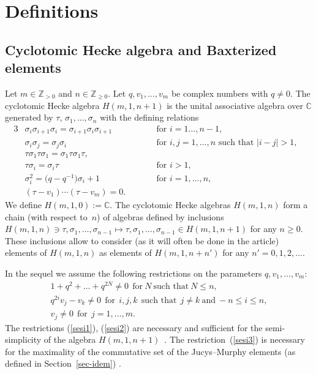 \section{Def\/initions}\label{sec-def}

\subsection{Cyclotomic Hecke algebra and Baxterized elements}\label{subsec-def}

Let $m\in\mathbb{Z}_{>0}$ and $n\in\mathbb{Z}_{\geq 0}$. Let $q,v_1,\dots,v_m$ be complex numbers with $q\neq 0$.
The cyclotomic Hecke algebra $H(m,1,n+1)$ is the unital associative algebra over $\mathbb{C}$ generated by $\tau$, $\sigma_1,\dots,\sigma_n$ with the def\/ining relations
\begin{alignat*}{3}
& \sigma_i\sigma_{i+1}\sigma_i=\sigma_{i+1}\sigma_i\sigma_{i+1}\qquad  && \text{for $i=1\dots,n-1$},& \nonumber\\
& \sigma_i\sigma_j=\sigma_j\sigma_i \qquad  && \text{for $i,j=1,\dots,n$ such that $|i-j|>1$},& \nonumber\\
& \tau\sigma_1\tau\sigma_1=\sigma_1\tau\sigma_1\tau ,\qquad &&& \nonumber\\
& \tau\sigma_i=\sigma_i\tau \qquad  && \text{for $i>1$},& \nonumber\\
& \sigma_i^2=\big(q-q^{-1}\big)\sigma_i+1 \qquad  && \text{for $i=1,\dots,n$},& \nonumber\\
& (\tau-v_1)\cdots(\tau-v_m)=0  .\qquad &&& %
 \end{alignat*}
We def\/ine $H(m,1,0):=\mathbb{C}$. The cyclotomic Hecke algebras $H(m,1,n)$ form a chain (with respect to~$n$)
of algebras def\/ined by inclusions
$H(m,1,n)\ni \tau,\sigma_1,\dots,\sigma_{n-1}\mapsto  \tau,\sigma_1,\dots,\sigma_{n-1}\in H(m,1,n+1)$ for any $n\geq 0$. These inclusions allow to consider (as it will often be done in the article) elements of $H(m,1,n)$ as elements of $H(m,1,n+n')$ for any $n'=0,1,2,\dots$.


In the sequel we assume the following restrictions on the parameters $q,v_1,\dots,v_m$:
\begin{gather}\label{sesi1}
 1+q^2+\dots+q^{2N}\neq 0\ \ {\textrm{for}}\ N\ \text{such that}\ N\leq n
 , \\
\label{sesi2}
 q^{2i}v_j-v_k\neq 0\ \ {\textrm{for}}\ \ i,j,k \ \ {\textrm{such that}}\ \  j\neq k \ {\textrm{and}}\ -n\leq i \leq n
 , \\
\label{sesi3}
 v_j\neq 0\ \ \text{for}\ \ j=1,\dots,m  .
\end{gather}
The restrictions (\ref{sesi1}), (\ref{sesi2}) are necessary and suf\/f\/icient for the semi-simplicity of
the algebra $H(m,1,n+1)$~\cite[main theorem]{A}.
The restriction~(\ref{sesi3}) is necessary for the maximality of the commutative
set of the Jucys--Murphy elements (as def\/ined in Section~\ref{sec-idem}) \cite[Proposition~3.2]{A}.



